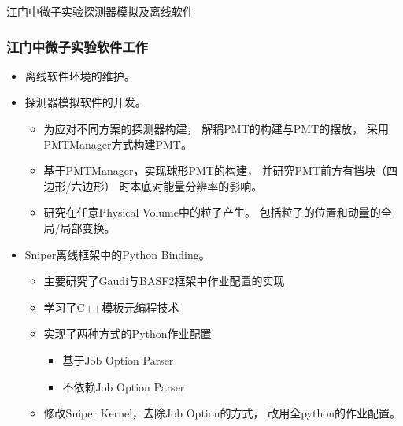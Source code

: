 \begin{frame}
    \begin{center}
        \LARGE 江门中微子实验探测器模拟及离线软件
    \end{center}
\end{frame}

\begin{frame}
    \frametitle{江门中微子实验软件工作}
    \begin{itemize}
        \item 离线软件环境的维护。
        \item 探测器模拟软件的开发。
            \begin{itemize}
                \item 为应对不同方案的探测器构建，
                      解耦PMT的构建与PMT的摆放，
                      采用PMTManager方式构建PMT。
                \item 基于PMTManager，实现球形PMT的构建，
                      并研究PMT前方有挡块（四边形/六边形）
                      时本底对能量分辨率的影响。
                \item 研究在任意Physical Volume中的粒子产生。
                      包括粒子的位置和动量的全局/局部变换。
            \end{itemize}
        \item Sniper离线框架中的Python Binding。
            \begin{itemize}
                \item 主要研究了Gaudi与BASF2框架中作业配置的实现
                \item 学习了C++模板元编程技术
                \item 实现了两种方式的Python作业配置
                    \begin{itemize}
                        \item 基于Job Option Parser
                        \item 不依赖Job Option Parser
                    \end{itemize}
                \item 修改Sniper Kernel，去除Job Option的方式，
                      改用全python的作业配置。
            \end{itemize}
    \end{itemize}
\end{frame}
